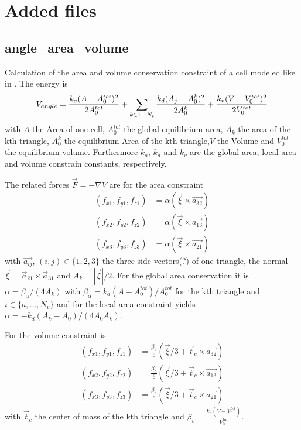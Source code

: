 
\chapter{Added files}


\section{angle\_area\_volume}

Calculation of the area and volume conservation constraint of a cell modeled like in \cite{Fedosov2010}. The energy is
\begin{equation}\label{eq:av}
 V_{angle} = \frac{k_a(A-A_0^{tot})^2}{2A_0^{tot}}+\sum_{k\in 1...N_t}{\frac{k_d(A_j-A^k_0)^2}{2A^k_0}}+\\
\frac{k_v(V-V_0^{tot})^2}{2V_0^{tot}}
\end{equation}
with $A$ the Area of one cell, $A_0^{tot}$ the global equilibrium area, $A_k$ the area of the kth triangle, $A^k_0$ the equilibrium Area of the kth triangle,$V$ the Volume and $V_0^{tot}$ the equilibrium volume. Furthermore $k_a$, $k_d$ and $k_v$ are the global area, local area and volume constrain constants, respectively.

The related forces $\vec{F} = -\nabla V$ are for the area constraint
\begin{align}
(f_{x1}, f_{y1}, f_{z1}) &= \alpha(\vec{\xi}\times\vec{a_{32}}) \nonumber \\
(f_{x2}, f_{y2}, f_{z2}) &= \alpha(\vec{\xi}\times\vec{a_{13}})\\
(f_{x3}, f_{y3}, f_{z3}) &= \alpha(\vec{\xi}\times\vec{a_{21}})\nonumber 
\end{align}
with $\vec{a_{ij}}$, $(i,j)\in \{1,2,3\}$ the three side vectors(?) of one triangle, the normal $\vec{\xi}=\vec{a}_{21}\times\vec{a}_{31}$ and  $A_k= |\vec{\xi}|/2$. For the global area conservation it is $\alpha=\beta_{\alpha}/(4A_k)$ with $\beta_{\alpha}=k_a(A-A_0^{tot})/A_0^{tot}$ for the kth triangle and $i \in \{a,...,N_v\}$ and for the local area constraint yields $\alpha = -k_d(A_k-A_0)/(4A_0A_k)$.

For the volume constraint is
\begin{align}
(f_{x1}, f_{y1}, f_{z1}) &= \frac{\beta_v}{6}(\vec{\xi}/3+\vec{t}_c\times\vec{a_{32}}) \nonumber \\
(f_{x2}, f_{y2}, f_{z2}) &= \frac{\beta_v}{6}(\vec{\xi}/3+\vec{t}_c\times\vec{a_{13}})\\
(f_{x3}, f_{y3}, f_{z3}) &= \frac{\beta_v}{6}(\vec{\xi}/3+\vec{t}_c\times\vec{a_{21}})\nonumber 
\end{align}
with $\vec{t}_c$ the center of mass of the kth triangle and $\beta_v = \frac{k_v(V-V_0^{tot})}{V_0^{tot}}$.


